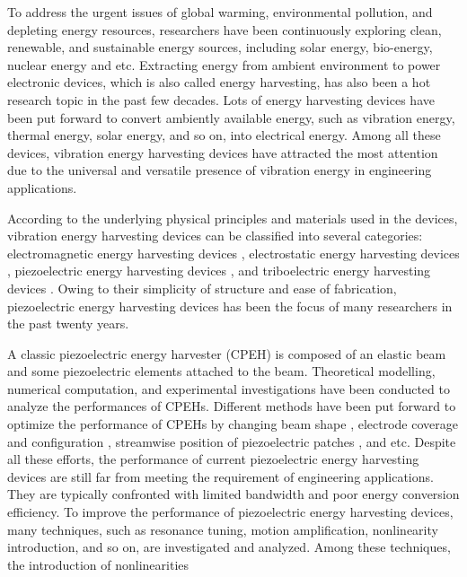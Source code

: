 \documentclass{elsarticle}
\begin{document}
To address the urgent issues of global warming, environmental pollution, and depleting energy resources, researchers have been continuously exploring clean, renewable, and sustainable energy sources, including solar energy, bio-energy, nuclear energy and etc. \cite{zhou2018review} Extracting energy from ambient environment to power electronic devices, which is also called energy harvesting, has also been a hot research topic in the past few decades. Lots of energy harvesting devices have been put forward to convert ambiently available energy, such as vibration energy, thermal energy, solar energy, and so on, into electrical energy. \cite{dagdeviren2017energy,safaei2019review} Among all these devices, vibration energy harvesting devices have attracted the most attention due to the universal and versatile presence of vibration energy in engineering applications. \cite{liu2018comprehensive}

According to the underlying physical principles and materials used in the devices, vibration energy harvesting devices can be classified into several categories: electromagnetic energy harvesting devices \cite{cepnik2013review,tan2016review}, electrostatic energy harvesting devices \cite{khan2016state,suzuki2011recent}, piezoelectric energy harvesting devices \cite{liu2018comprehensive,sodano2004review}, and triboelectric energy harvesting devices \cite{fan2016flexible,wang2015progress}. Owing to their simplicity of structure and ease of fabrication, piezoelectric energy harvesting devices has been the focus of many researchers in the past twenty years. \cite{anton2007review,safaei2019review}

A classic piezoelectric energy harvester (CPEH) is composed of an elastic beam and some piezoelectric elements attached to the beam. Theoretical modelling, numerical computation, and experimental investigations have been conducted to analyze the performances of CPEHs. \cite{erturk2008distributed,erturk2009experimentally} Different methods have been put forward to optimize the performance of CPEHs by changing beam shape \cite{goldschmidtboeing2008characterization}, electrode coverage \cite{fu2018electrode} and configuration \cite{kim2015effect}, streamwise position of piezoelectric patches \cite{liao2012optimal,patel2011geometric}, and etc. Despite all these efforts, the performance of current piezoelectric energy harvesting devices are still far from meeting the requirement of engineering applications. They are typically confronted with limited bandwidth and poor energy conversion efficiency. To improve the performance of piezoelectric energy harvesting devices, many techniques, such as resonance tuning, motion amplification, nonlinearity introduction, and so on, are investigated and analyzed.\cite{yildirim2017review,tran2018ambient} Among these techniques, the introduction of nonlinearities 
\end{document}
